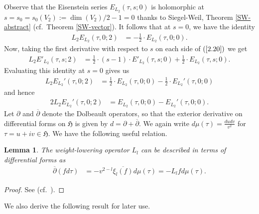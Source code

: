 \documentclass{amsart}
\newtheorem{lemma}[theorem]{Lemma}
\theoremstyle{definition}
\begin{document}
Observe that the Eisenstein series $E_{L_2}(\tau, s; 0)$ is holomorphic at $s= s_0 = s_0(V_2) := \dim(V_2)/2 -1= 0$ 
thanks to Siegel-Weil, Theorem \ref{SW-abstract} (cf.~Theorem \ref{SW-vector}). It follows that  at $s=0$, we have the identity
\begin{align}\label{EisID} L_2 E_{L_2}(\tau, 0; 2) &= - \frac{1}{2} \cdot E_{L_2}(\tau, 0; 0). \end{align}
Now, taking the first derivative with respect to $s$ on each side of $(\ref{2.20})$ we get 
\begin{align*} L_2 E'_{L_2}(\tau, s; 2) 
&= \frac{1}{2} \cdot (s-1) \cdot E'_{L_2}(\tau, s; 0) + \frac{1}{2} \cdot E_{L_2}(\tau, s; 0). \end{align*}
Evaluating this identity at $s=0$ gives us 
\begin{equation*}\begin{aligned} L_2 E_{L_2}'(\tau, 0; 2) 
&= \frac{1}{2} \cdot E_{L_2}(\tau, 0; 0) - \frac{1}{2} \cdot E_{L_2}'(\tau, 0;0) \end{aligned}\end{equation*}
and hence 
\begin{equation}\begin{aligned}\label{2.21}  2 L_2 E_{L_2}'(\tau, 0; 2) &=
E_{L_2}(\tau, 0; 0) - E_{L_2}'(\tau, 0; 0). \end{aligned}\end{equation}
Let $\partial$ and $\overline{\partial}$ denote the Dolbeault operators, so that the exterior 
derivative on differential forms on $\mathfrak{H}$ is given by $d = \partial + \overline{\partial}$.
We again write $d \mu(\tau) = \frac{du dv}{v^2}$ for $\tau = u + iv \in \mathfrak{H}$. We have the following useful relation.

\begin{lemma}\label{diff} The weight-lowering operator $L_l$ can be described in terms of differential forms as 
\begin{align*} \overline{\partial}(f d \tau) &= -v^{2-l} \overline{\xi_l(f)} d \mu(\tau) = - L_l f d \mu (\tau). \end{align*} \end{lemma}
\begin{proof} See \cite[Lemma 2.5]{Eh} (cf.~\cite[Lemma 2.3]{BY}). \end{proof}

We also derive the following result for later use.
\end{document}
